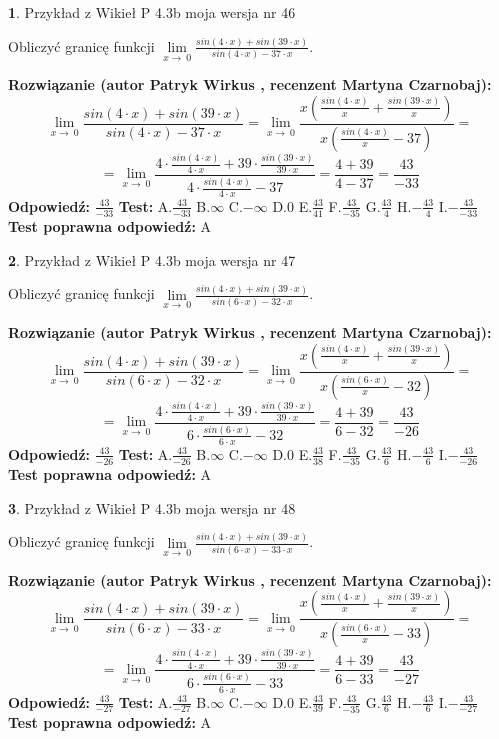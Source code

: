 \documentclass[12pt, a4paper]{article}
\theoremstyle{definition} %
\newtheorem{zad}{}
\newcommand{\zadStart}[1]{\begin{zad}#1\newline}
\newcommand{\zadStop}{\end{zad}}
\newcommand{\rozwStart}[2]{\noindent \textbf{Rozwiązanie (autor #1 , recenzent #2): }\newline}
\newcommand{\rozwStop}{\newline}
\newcommand{\odpStart}{\noindent \textbf{Odpowiedź:}\newline}
\newcommand{\odpStop}{\newline}
\newcommand{\testStart}{\noindent \textbf{Test:}\newline}
\newcommand{\testStop}{\newline}
\newcommand{\kluczStart}{\noindent \textbf{Test poprawna odpowiedź:}\newline}
\newcommand{\kluczStop}{\newline}
\begin{document}
\zadStart{Przykład z Wikieł P 4.3b moja wersja nr 46}


Obliczyć granicę funkcji $\lim\limits_{x\to\ 0}\frac{sin(4 \cdot x)+sin(39 \cdot x)}{sin(4 \cdot x)-37 \cdot x}$.
\zadStop
\rozwStart{Patryk Wirkus}{Martyna Czarnobaj}
$$\lim\limits_{x\to\ 0}\frac{sin(4 \cdot x)+sin(39 \cdot x)}{sin(4 \cdot x)-37 \cdot x}=\lim\limits_{x\to\ 0}\frac{x(\frac{sin(4 \cdot x)}{x}+\frac{sin(39 \cdot x)}{x})}{x(\frac{sin(4 \cdot x)}{x}-37)}=$$
$$=\lim\limits_{x\to\ 0}\frac{4 \cdot \frac{sin(4 \cdot x)}{4 \cdot x}+39 \cdot \frac{sin(39 \cdot x)}{39 \cdot x}}{4 \cdot \frac{sin(4 \cdot x)}{4 \cdot x}-37}=\frac{4+39}{4-37} = \frac{43}{-33}$$
\rozwStop
\odpStart
$\frac{43}{-33}$
\odpStop
\testStart
A.$\frac{43}{-33}$
B.$\infty$
C.$-\infty$
D.$0$
E.$\frac{43}{41}$
F.$\frac{43}{-35}$
G.$\frac{43}{4}$
H.$-\frac{43}{4}$
I.$-\frac{43}{-33}$
\testStop
\kluczStart
A
\kluczStop



\zadStart{Przykład z Wikieł P 4.3b moja wersja nr 47}


Obliczyć granicę funkcji $\lim\limits_{x\to\ 0}\frac{sin(4 \cdot x)+sin(39 \cdot x)}{sin(6 \cdot x)-32 \cdot x}$.
\zadStop
\rozwStart{Patryk Wirkus}{Martyna Czarnobaj}
$$\lim\limits_{x\to\ 0}\frac{sin(4 \cdot x)+sin(39 \cdot x)}{sin(6 \cdot x)-32 \cdot x}=\lim\limits_{x\to\ 0}\frac{x(\frac{sin(4 \cdot x)}{x}+\frac{sin(39 \cdot x)}{x})}{x(\frac{sin(6 \cdot x)}{x}-32)}=$$
$$=\lim\limits_{x\to\ 0}\frac{4 \cdot \frac{sin(4 \cdot x)}{4 \cdot x}+39 \cdot \frac{sin(39 \cdot x)}{39 \cdot x}}{6 \cdot \frac{sin(6 \cdot x)}{6 \cdot x}-32}=\frac{4+39}{6-32} = \frac{43}{-26}$$
\rozwStop
\odpStart
$\frac{43}{-26}$
\odpStop
\testStart
A.$\frac{43}{-26}$
B.$\infty$
C.$-\infty$
D.$0$
E.$\frac{43}{38}$
F.$\frac{43}{-35}$
G.$\frac{43}{6}$
H.$-\frac{43}{6}$
I.$-\frac{43}{-26}$
\testStop
\kluczStart
A
\kluczStop



\zadStart{Przykład z Wikieł P 4.3b moja wersja nr 48}


Obliczyć granicę funkcji $\lim\limits_{x\to\ 0}\frac{sin(4 \cdot x)+sin(39 \cdot x)}{sin(6 \cdot x)-33 \cdot x}$.
\zadStop
\rozwStart{Patryk Wirkus}{Martyna Czarnobaj}
$$\lim\limits_{x\to\ 0}\frac{sin(4 \cdot x)+sin(39 \cdot x)}{sin(6 \cdot x)-33 \cdot x}=\lim\limits_{x\to\ 0}\frac{x(\frac{sin(4 \cdot x)}{x}+\frac{sin(39 \cdot x)}{x})}{x(\frac{sin(6 \cdot x)}{x}-33)}=$$
$$=\lim\limits_{x\to\ 0}\frac{4 \cdot \frac{sin(4 \cdot x)}{4 \cdot x}+39 \cdot \frac{sin(39 \cdot x)}{39 \cdot x}}{6 \cdot \frac{sin(6 \cdot x)}{6 \cdot x}-33}=\frac{4+39}{6-33} = \frac{43}{-27}$$
\rozwStop
\odpStart
$\frac{43}{-27}$
\odpStop
\testStart
A.$\frac{43}{-27}$
B.$\infty$
C.$-\infty$
D.$0$
E.$\frac{43}{39}$
F.$\frac{43}{-35}$
G.$\frac{43}{6}$
H.$-\frac{43}{6}$
I.$-\frac{43}{-27}$
\testStop
\kluczStart
A
\kluczStop
\end{document}
